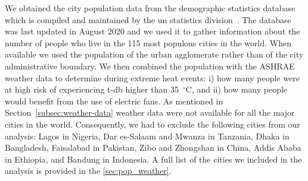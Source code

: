 
We obtained the city population data from the demographic statistics database which is compiled and maintained by the \ac{un} statistics division~\cite{UNdatare88:online}.
The database was last updated in August 2020 and we used it to gather information about the number of people who live in the 115 most populous cities in the world.
When available we used the population of the urban agglomerate rather than of the city administrative boundary.
We then combined the population with the ASHRAE weather data to determine during extreme heat events: i) how many people were at high risk of experiencing \ac{t-db} higher than 35~$^{\circ}$C\@, and ii) how many people would benefit from the use of electric fans.
As mentioned in Section~\ref{subsec:weather-data} weather data were not available for all the major cities in the world.
Consequently, we had to exclude the following cities from our analysis: Lagos in Nigeria, Dar es-Salaam and Mwanza in Tanzania, Dhaka in Bangladesh, Faisalabad in Pakistan, Zibo and Zhongshan in China, Addis Ababa in Ethiopia, and Bandung in Indonesia.
A full list of the cities we included in the analysis is provided in the \ref{sec:pop_weather}.

